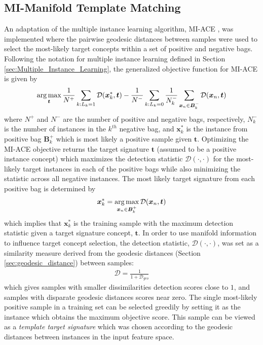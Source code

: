 \subsection{MI-Manifold Template Matching} \label{sec:miace_geo}
An adaptation of the multiple instance learning algorithm, MI-ACE \citep{Zare2016MIACE}, was implemented where the pairwise geodesic distances between samples were used to select the most-likely target concepts within a set of positive and negative bags.  Following the notation for multiple instance learning defined in Section \ref{sec:Multiple_Instance_Learning}, the generalized objective function for MI-ACE is given by
\begin{align}
    \operatorname*{arg\,max}_{\bm{t}} \frac{1}{N^{+}} \sum_{k:L_{k}=1} \mathcal{D}(\bm{x}^{*}_{k},\bm{t}) - \frac{1}{N^{-}} \sum_{k:L_{k}=0} \frac{1}{N^{-}_{k}} \sum_{\bm{x}_{n} \in \bm{B}^{-}_{k}}  \mathcal{D}(\bm{x}_{n},\bm{t})
\end{align}
\noindent where $N^{+}$ and $N^{-}$ are the number of positive and negative bags, respectively, $N^{-}_{k}$ is the number of instances in the $k^{th}$ negative bag, and $\bm{x}^{*}_{k}$ is the instance from positive bag $\bm{B}^{+}_{k}$ which is most likely a positive sample given $\bm{t}$. Optimizing the MI-ACE objective returns the target signature $\bm{t}$ (assumed to be a positive instance concept) which maximizes the detection statistic $\mathcal{D}(\cdot,\cdot)$ for the most-likely target instances in each of the positive bags while also minimizing the statistic across all negative instances.  The most likely target signature from each positive bag is determined by 
\begin{align}
    \bm{x}^{*}_{k} = \operatorname*{arg\,max}_{\bm{x}_{n} \in \bm{B}^{+}_{k}} \mathcal{D}(\bm{x}_{n},\bm{t})
\end{align}
\noindent which implies that $\bm{x}^{*}_{k}$ is the training sample with the maximum detection statistic given a target signature concept, $\bm{t}$.  In order to use manifold information to influence target concept selection, the detection statistic, $\mathcal{D}(\cdot,\cdot)$, was set as a similarity measure derived from the geodesic distances (Section \ref{sec:geodesic_distance}) between samples:
\begin{align} \label{eq:mi_manifold_template_matching_metric}
    \mathcal{D} = \frac{1}{1 + \mathcal{D}_{geo}}
\end{align}
\noindent which gives samples with smaller dissimilarities detection scores close to $1$, and samples with disparate geodesic distances scores near zero.  The single most-likely positive sample in a training set can be selected greedily by setting it as the instance which obtains the maximum objective score. This sample can be viewed as a \textit{template target signature} which was chosen according to the geodesic distances between instances in the input feature space.


